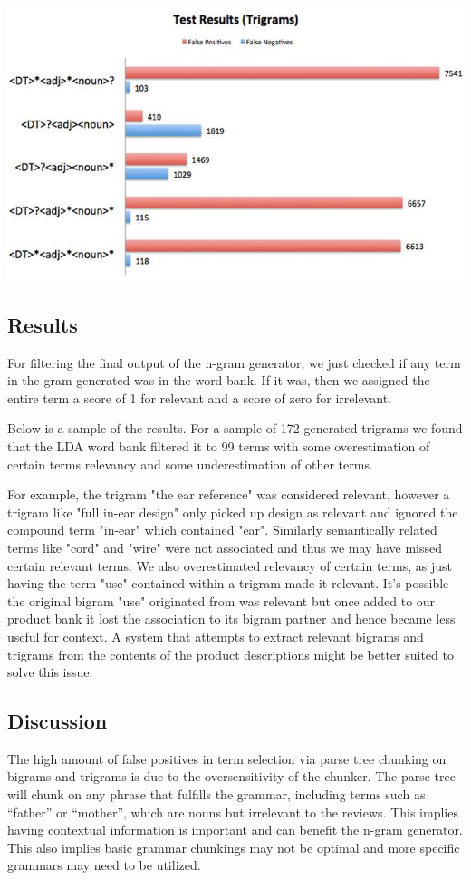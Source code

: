 \documentclass{article}
\begin{document}
\includegraphics[scale = 0.35]{trigramsFalse.jpg}

\subsection{Results}
For filtering the final output of the n-gram generator, we just checked if any term in the gram generated was in the word bank. If it was, then we assigned the entire term a score of 1 for relevant and a score of zero for irrelevant.

Below is a sample of the results. For a sample of 172 generated trigrams we found that the LDA word bank filtered it to 99 terms with some overestimation of certain terms relevancy and some underestimation of other terms.

For example, the trigram "the ear reference" was considered relevant, however a trigram like "full in-ear design" only picked up design as relevant and ignored the compound term "in-ear" which contained "ear". Similarly semantically related terms like "cord" and "wire" were not associated and thus we may have missed certain relevant terms. We also overestimated relevancy of certain terms, as just having the term "use" contained within a trigram made it relevant. It's possible the original bigram "use" originated from was relevant but once added to our product bank it lost the association to its bigram partner and hence became less useful for context. A system that attempts to extract relevant bigrams and trigrams from the contents of the product descriptions might be better suited to solve this issue. 

\subsection{Discussion}
The high amount of false positives in term selection via parse tree chunking on bigrams and trigrams is due to the oversensitivity of the chunker. The parse tree will chunk on any phrase that fulfills the grammar, including terms such as “father” or “mother”, which are nouns but irrelevant to the reviews. This implies having contextual information is important and can benefit the n-gram generator. This also implies basic grammar chunkings may not be optimal and more specific grammars may need to be utilized.
\end{document}
